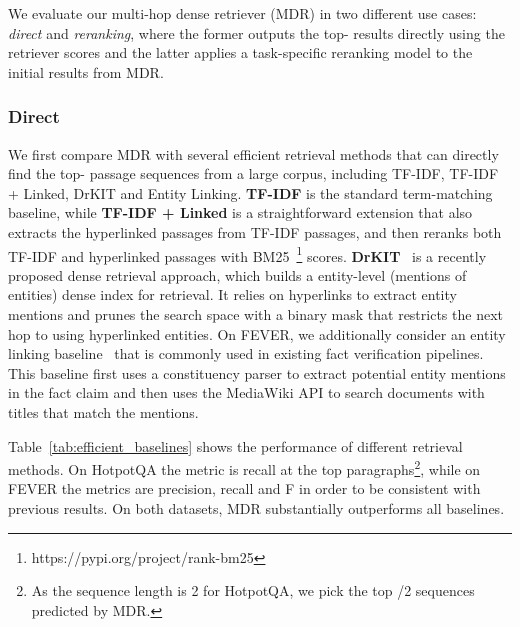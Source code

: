 \documentclass{article} \usepackage{iclr2021_conference,times}
\newcommand{\method}{MDR\xspace}
\begin{document}
We evaluate our multi-hop dense retriever (\method) in two different use cases: \emph{direct} and \emph{reranking}, where the former outputs the top- results directly using the retriever scores and the latter applies a task-specific reranking model to the initial results from \method.



\subsubsection{Direct}

We first compare \method with several efficient retrieval methods that can directly find the top- passage sequences from a large corpus, including TF-IDF, TF-IDF + Linked, DrKIT and Entity Linking. \textbf{TF-IDF} is the standard term-matching baseline, while \textbf{TF-IDF + Linked} is a straightforward extension that also extracts the hyperlinked passages from TF-IDF passages, and then reranks both TF-IDF and hyperlinked passages with BM25~\footnote{https://pypi.org/project/rank-bm25} scores. \textbf{DrKIT}~\citep{DrKIT} is a recently proposed dense retrieval approach, which builds a entity-level (mentions of entities) dense index for retrieval. It relies on hyperlinks to extract entity mentions and prunes the search space with a binary mask that restricts the next hop to using hyperlinked entities. 
On FEVER, we additionally consider an entity linking baseline~\citep{UKP} that is commonly used in existing fact verification pipelines. This baseline first uses a constituency parser to extract potential entity mentions in the fact claim and then uses the MediaWiki API to search documents with titles that match the mentions. 



Table~\ref{tab:efficient_baselines} shows the performance of different retrieval methods. On HotpotQA the metric is recall at the top  paragraphs\footnote{As the sequence length is 2 for HotpotQA, we pick the top /2 sequences predicted by \method.}, while on FEVER the metrics are precision, recall and F in order to be consistent with previous results. On both datasets, \method substantially outperforms all baselines.
\end{document}
